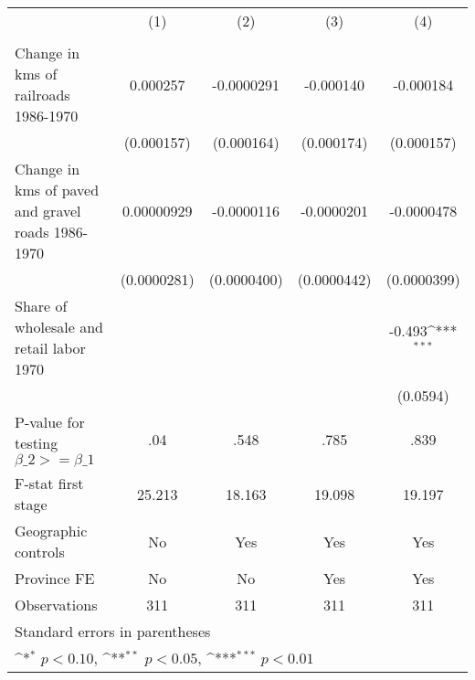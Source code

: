 {
\def\sym#1{\ifmmode^{#1}\else\(^{#1}\)\fi}
\begin{tabular}{l*{4}{c}}
\hline\hline
                &\multicolumn{1}{c}{(1)}&\multicolumn{1}{c}{(2)}&\multicolumn{1}{c}{(3)}&\multicolumn{1}{c}{(4)}\\
                &\multicolumn{1}{c}{}&\multicolumn{1}{c}{}&\multicolumn{1}{c}{}&\multicolumn{1}{c}{}\\
\hline
Change in kms of railroads 1986-1970& 0.000257         &-0.0000291         &-0.000140         &-0.000184         \\
                &(0.000157)         &(0.000164)         &(0.000174)         &(0.000157)         \\
[1em]
Change in kms of paved and gravel roads 1986-1970&0.00000929         &-0.0000116         &-0.0000201         &-0.0000478         \\
                &(0.0000281)         &(0.0000400)         &(0.0000442)         &(0.0000399)         \\
[1em]
Share of wholesale and retail labor 1970&                  &                  &                  &   -0.493\sym{***}\\
                &                  &                  &                  & (0.0594)         \\
\hline
P-value for testing $\beta\_{2} >= \beta\_{1}$&      .04         &     .548         &     .785         &     .839         \\
F-stat first stage&   25.213         &   18.163         &   19.098         &   19.197         \\
Geographic controls&       No         &      Yes         &      Yes         &      Yes         \\
Province FE     &       No         &       No         &      Yes         &      Yes         \\
Observations    &      311         &      311         &      311         &      311         \\
\hline\hline
\multicolumn{5}{l}{\footnotesize Standard errors in parentheses}\\
\multicolumn{5}{l}{\footnotesize \sym{*} \(p<0.10\), \sym{**} \(p<0.05\), \sym{***} \(p<0.01\)}\\
\end{tabular}
}
